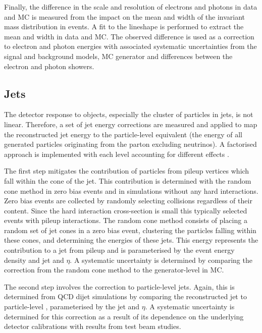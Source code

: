Finally, the difference in the scale and resolution of electrons and photons in data and MC is measured from the impact on the mean and width of the invariant mass distribution in \IDYee events. A fit to the \PZ lineshape is performed to extract the mean and width in data and MC. The observed difference is used as a correction to electron and photon energies with associated systematic uncertainties from the signal and background models, MC generator and differences between the electron and photon showers.



\subsection{Jets}

The detector response to objects, especially the cluster of particles in jets, is not linear. Therefore, a set of jet energy corrections are measured and applied to map the reconstructed jet energy to the particle-level equivalent (the energy of all generated particles originating from the parton excluding neutrinos). A factorised approach is implemented with each level accounting for different effects \cite{Khachatryan:2016kdb}.

The first step mitigates the contribution of particles from pileup vertices which fall within the cone of the jet. This contribution is determined with the random cone method in zero bias events and in simulations without any hard interactions. Zero bias events are collected by randomly selecting collisions regardless of their content. Since the hard interaction cross-section is small this typically selected events with pileup interactions. The random cone method consists of placing a random set of jet cones in a zero bias event, clustering the particles falling within these cones, and determining the energies of these jets. This energy represents the contribution to a jet from pileup and is parameterised by the event energy density and jet \pt and $\eta$. A systematic uncertainty is determined by comparing the correction from the random cone method to the generator-level in MC.

The second step involves the correction to particle-level jets. Again, this is determined from QCD dijet simulations by comparing the reconstructed jet \pt to particle-level \pt, parameterised by the jet \pt and $\eta$. A systematic uncertainty is determined for this correction as a result of its dependence on the underlying detector calibrations with results from test beam studies.

